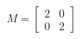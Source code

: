 \documentclass[preview]{standalone}
\begin{document}
\begin{align*}
M = \begin{bmatrix} 2 & 0 \\ 0 & 2 \end{bmatrix}
\end{align*}
\end{document}
